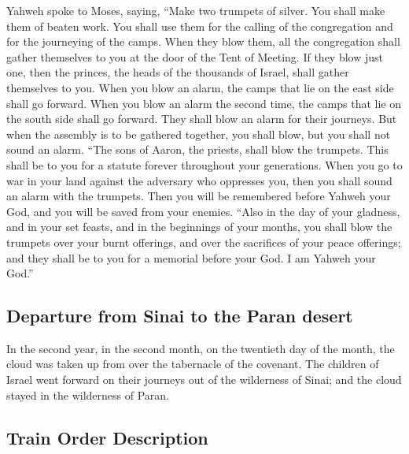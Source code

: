  Yahweh spoke to Moses, saying,  ``Make two
trumpets of silver. You shall make them of beaten work. You shall use
them for the calling of the congregation and for the journeying of the
camps.  When they blow them, all the congregation shall
gather themselves to you at the door of the Tent of Meeting.
 If they blow just one, then the princes, the heads of the
thousands of Israel, shall gather themselves to you.  When
you blow an alarm, the camps that lie on the east side shall go forward.
 When you blow an alarm the second time, the camps that
lie on the south side shall go forward. They shall blow an alarm for
their journeys.  But when the assembly is to be gathered
together, you shall blow, but you shall not sound an alarm.
 ``The sons of Aaron, the priests, shall blow the
trumpets. This shall be to you for a statute forever throughout your
generations.  When you go to war in your land against the
adversary who oppresses you, then you shall sound an alarm with the
trumpets. Then you will be remembered before Yahweh your God, and you
will be saved from your enemies.  ``Also in the day of
your gladness, and in your set feasts, and in the beginnings of your
months, you shall blow the trumpets over your burnt offerings, and over
the sacrifices of your peace offerings; and they shall be to you for a
memorial before your God. I am Yahweh your God.''

\hypertarget{departure-from-sinai-to-the-paran-desert}{%
\subsection{Departure from Sinai to the Paran
desert}\label{departure-from-sinai-to-the-paran-desert}}

 In the second year, in the second month, on the
twentieth day of the month, the cloud was taken up from over the
tabernacle of the covenant.  The children of Israel went
forward on their journeys out of the wilderness of Sinai; and the cloud
stayed in the wilderness of Paran.

\hypertarget{train-order-description}{%
\subsection{Train Order Description}\label{train-order-description}}

